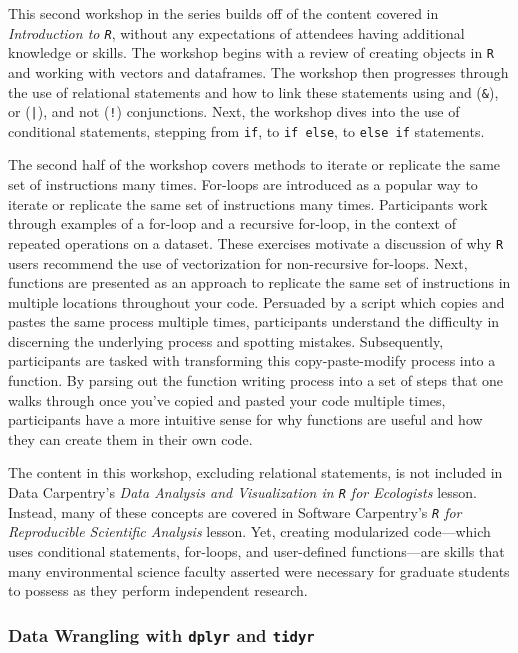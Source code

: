 \documentclass[12pt]{article}
\begin{document}
\quad This second workshop in the series builds off of the content covered in 
\emph{Introduction to \texttt{R}}, without any expectations of attendees having
additional knowledge or skills. The workshop begins with a review of creating
objects in \texttt{R} and working with vectors and dataframes. The workshop then
progresses through the use of relational statements and how to link these 
statements using and (\texttt{\&}), or (\texttt{|}), and not (\texttt{!})
conjunctions. Next, the workshop dives into the use of conditional statements,
stepping from \texttt{if}, to \texttt{if else}, to \texttt{else if} statements. 

\quad The second half of the workshop covers methods to iterate or replicate the
same set of instructions many times. For-loops are introduced as a popular way
to iterate or replicate the same set of instructions many times. Participants
work through examples of a for-loop and a recursive for-loop, in the context of
repeated operations on a dataset. These exercises motivate a discussion of why
\texttt{R} users recommend the use of vectorization for non-recursive for-loops. 
Next, functions are presented as an approach to replicate the same set
of instructions in multiple locations throughout your code. Persuaded by a 
script which copies and pastes the same process multiple times, participants
understand the difficulty in discerning the underlying process and spotting
mistakes. Subsequently, participants are tasked with transforming this 
copy-paste-modify process into a function. By parsing out the function writing
process into a set of steps that one walks through once you've copied and pasted
your code multiple times, participants have a more intuitive sense for why 
functions are useful and how they can create them in their own code.

\quad The content in this workshop, excluding relational statements, is not
included in Data Carpentry's \emph{Data Analysis and Visualization in \texttt{R}
for Ecologists} lesson. Instead, many of these concepts are covered in Software
Carpentry's \emph{\texttt{R} for Reproducible Scientific Analysis} lesson. Yet,
creating modularized code---which uses conditional statements, for-loops, and
user-defined functions---are skills that many environmental science faculty
asserted were necessary for graduate students to possess as they perform
independent research.  


\subsubsection{Data Wrangling with \texttt{dplyr} and \texttt{tidyr}}
\label{sec:wrangle}
\end{document}

